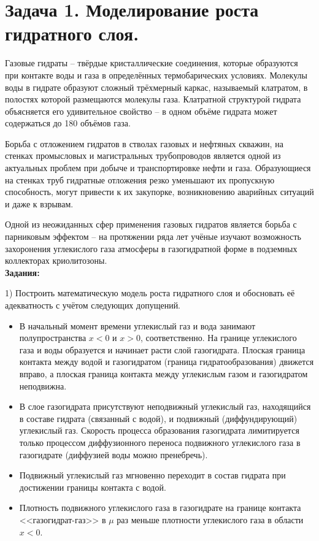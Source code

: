 \documentclass[a4paper, 12pt]{article}
\begin{document}

\section{Задача 1. Моделирование роста гидратного слоя.}

Газовые гидраты -- твёрдые кристаллические соединения, которые образуются при контакте воды и газа в определённых термобарических условиях.
Молекулы воды в гидрате образуют сложный трёхмерный каркас, называемый клатратом, в полостях которой размещаются молекулы газа.
Клатратной структурой гидрата объясняется его удивительное свойство -- в одном объёме гидрата может содержаться до 180 объёмов газа.

Борьба с отложением гидратов в стволах газовых и нефтяных скважин, на стенках промысловых и магистральных трубопроводов является одной из актуальных проблем при добыче и транспортировке нефти и газа.
Образующиеся на стенках труб гидратные отложения резко уменьшают их пропускную способность, могут привести к их закупорке, возникновению аварийных ситуаций и даже к взрывам.

Одной из неожиданных сфер применения газовых гидратов является борьба с парниковым эффектом -- на протяжении ряда лет учёные изучают возможность захоронения углекислого газа атмосферы в газогидратной форме в подземных коллекторах криолитозоны.\\

\textbf{Задания:}

1) Построить математическую модель роста гидратного слоя и обосновать её адекватность с учётом следующих допущений.
\begin{itemize}
	\item В начальный момент времени углекислый газ и вода занимают полупространства $x<0$ и $x>0$, соответственно.
	На границе углекислого газа и воды образуется и начинает расти слой газогидрата.
	Плоская граница контакта между водой и газогидратом (граница гидратообразования) движется вправо, а плоская граница контакта между углекислым газом и газогидратом неподвижна.
	\item В слое газогидрата присутствуют неподвижный углекислый газ, находящийся в составе гидрата (связанный с водой), и подвижный (диффундирующий) углекислый газ.
	Скорость процесса образования газогидрата лимитируется только процессом диффузионного переноса подвижного углекислого газа в газогидрате (диффузией воды можно пренебречь).
	\item Подвижный углекислый газ мгновенно переходит в состав гидрата при достижении границы контакта с водой.
	\item Плотность подвижного углекислого газа в газогидрате на границе контакта <<газогидрат-газ>> в $\mu$ раз меньше плотности углекислого газа в области $x<0$.
\end{itemize} 
\end{document}
